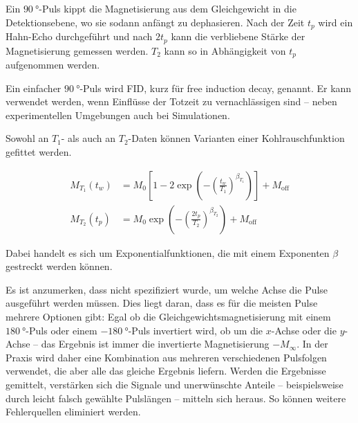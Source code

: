 Ein $\SI{90}{\degree}$-Puls kippt die Magnetisierung aus dem Gleichgewicht in die Detektionsebene, wo sie sodann anfängt zu dephasieren. Nach der Zeit $t_p$ wird ein Hahn-Echo durchgeführt und nach $2 t_p$ kann die verbliebene Stärke der Magnetisierung gemessen werden. $T_2$ kann so in Abhängigkeit von $t_p$ aufgenommen werden.

Ein einfacher $\SI{90}{\degree}$-Puls wird FID, kurz für free induction decay, genannt. Er kann verwendet werden, wenn Einflüsse der Totzeit zu vernachlässigen sind -- neben experimentellen Umgebungen auch bei Simulationen.


Sowohl an $T_1$- als auch an $T_2$-Daten können Varianten einer Kohlrauschfunktion gefittet werden.

\begin{align}
	M_{T_1} (t_w) &= M_0 \left[ 1 - 2 \exp{ \left(- { \left( \frac{t_w}{T_1} \right) }^{\beta_{T_1}} \right)} \right] + M_\text{off} \label{eqn:theo:T_1_fit} \\
    M_{T_2} (t_p) &= M_0 \exp{ \left(- { \left( \frac{2 t_p}{T_2} \right) }^{\beta_{T_2}} \right)} + M_\text{off} \label{eqn:theo:T_2_fit}
\end{align}

Dabei handelt es sich um Exponentialfunktionen, die mit einem Exponenten $\beta$ gestreckt werden können. %

Es ist anzumerken, dass nicht spezifiziert wurde, um welche Achse die Pulse ausgeführt werden müssen. Dies liegt daran, dass es für die meisten Pulse mehrere Optionen gibt: Egal ob die Gleichgewichtsmagnetisierung mit einem $\SI{180}{\degree}$-Puls oder einem $\SI{-180}{\degree}$-Puls invertiert wird, ob um die $x$-Achse oder die $y$-Achse -- das Ergebnis ist immer die invertierte Magnetisierung $-M_\infty$. In der Praxis wird daher eine Kombination aus mehreren verschiedenen Pulsfolgen verwendet, die aber alle das gleiche Ergebnis liefern. Werden die Ergebnisse gemittelt, verstärken sich die Signale und unerwünschte Anteile -- beispielsweise durch leicht falsch gewählte Pulslängen -- mitteln sich heraus. So können weitere Fehlerquellen eliminiert werden.




